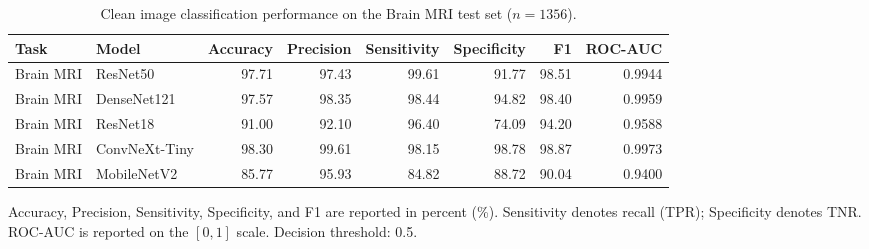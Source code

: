\begin{table}[htbp]
  \centering
  \caption{Clean image classification performance on the Brain MRI test set ($n=1356$).}
  \label{tab:brain_mri_clean_five_models}
  \begin{tabular}{llrrrrrr}
    \toprule
    Task & Model & Accuracy & Precision & Sensitivity & Specificity & F1 & ROC-AUC \\
    \midrule
    Brain MRI & ResNet50       & 97.71 & 97.43 & 99.61 & 91.77 & 98.51 & 0.9944 \\
    Brain MRI & DenseNet121    & 97.57 & 98.35 & 98.44 & 94.82 & 98.40 & 0.9959 \\
    Brain MRI & ResNet18       & 91.00 & 92.10 & 96.40 & 74.09 & 94.20 & 0.9588 \\
    Brain MRI & ConvNeXt-Tiny  & 98.30 & 99.61 & 98.15 & 98.78 & 98.87 & 0.9973 \\
    Brain MRI & MobileNetV2    & 85.77 & 95.93 & 84.82 & 88.72 & 90.04 & 0.9400 \\
    \bottomrule
  \end{tabular}
  \vspace{0.25em}
  \begin{minipage}{0.92\linewidth}
    \footnotesize
    Accuracy, Precision, Sensitivity, Specificity, and F1 are reported in percent (\%).
    Sensitivity denotes recall (TPR); Specificity denotes TNR.
    ROC-AUC is reported on the $[0,1]$ scale. Decision threshold: 0.5.
  \end{minipage}
\end{table}
